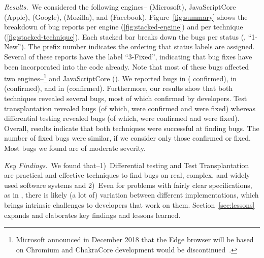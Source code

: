 \documentclass[smallextended]{svjour3}
\begin{document}
\sloppy \emph{Results.}~We considered the following engines--\chakra{}
(Microsoft), JavaScriptCore (Apple), \veight{} (Google), \smonkey{}
(Mozilla), and \hermes (Facebook). Figure~\ref{fig:summary} shows the
breakdown of bug reports per engine (\ref{fig:stacked-engine}) and per
technique (\ref{fig:stacked-technique}).  Each stacked bar breaks down
the bugs per status (\eg{}, ``1-New''). The prefix number indicates
the ordering that status labels are assigned. Several of these reports
have the label ``3-Fixed'', indicating that bug fixes have been
incorporated into the code already. Note that most of these bugs
affected two engines--\chakra{}\footnote{Microsoft announced in
  December 2018 that the Edge browser will be based on Chromium and
  ChakraCore development would be
  discontinued~\cite{chakra-discontinued}.} and JavaScriptCore (\jsc).
We reported \noBugsBugsReportedGoogle{} bugs in \veight{}
(\noBugsBugsConfirmedGoogle{} confirmed), \noBugsBugsReportedHermes in
\hermes (\noBugsBugsConfirmedHermes confirmed), and
\noBugsBugsReportedSMonkey in \smonkey{} (\noBugsBugsConfirmedSMonkey confirmed).
Furthermore, our results show that both techniques revealed several
bugs, most of which confirmed by developers. Test transplantation
revealed \noBugsTransplantation bugs (of which,
\noBugsTransplantationConfirmed were confirmed and
\noBugsTransplantationFixed were fixed) whereas differential testing
revealed \noBugsDifferentialTesting bugs (of which,
\noBugsDifferentialTestingConfirmed were confirmed and
\noBugsDifferentialTestingFixed were fixed).  Overall, results
indicate that both techniques were successful at finding bugs. The
number of fixed bugs were similar, if we consider only those confirmed
or fixed. Most bugs we found are of moderate severity.



\emph{Key Findings.}~We found that--1)~Differential testing and Test
Transplantation are practical and effective techniques to find bugs on real,
complex, and widely used software systems and 2)~Even for problems with
fairly clear specifications, as in \javascript{}, there is likely (a
lot of) variation between different implementations, which brings intrinsic
challenges to developers that work on them.
Section~\ref{sec:lessons} expands and elaborates key
findings and lessons learned.
\end{document}
